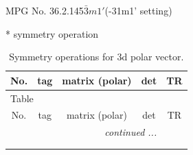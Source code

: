 \documentclass[fleqn,8pt]{jsarticle}
\begin{document}
\setcounter{MaxMatrixCols}{32}

\renewcommand{\tablename}{Table~}
\renewcommand{\figurename}{Figure~}
\begin{center}
\LARGE
MPG No. 36.2.145\quad$\bar{3}m1'$\quad(-31m1' setting)
\end{center}
* symmetry operation
\renewcommand{\arraystretch}{1.3}
\begin{longtable}{ccccc}
\caption{Symmetry operations for 3d polar vector.}
 \\
 \hline \hline
No. & tag & matrix (polar) & det & TR \\ \hline \endfirsthead

\multicolumn{4}{l}{\tablename\ \thetable{}} \\
 \hline \hline
No. & tag & matrix (polar) & det & TR \\ \hline \endhead

 \hline \hline
\multicolumn{4}{r}{\footnotesize\it continued ...} \\ \endfoot

 \hline \hline
\multicolumn{4}{r}{} \\ \endlastfoot


\end{longtable}
\end{document}
